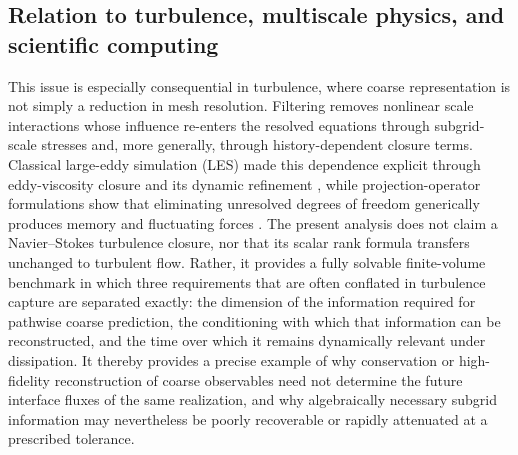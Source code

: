 \documentclass[pdflatex,sn-mathphys-num]{sn-jnl}%
\theoremstyle{thmstyleone}%
\theoremstyle{thmstyletwo}%
\theoremstyle{thmstylethree}%
\begin{document}

\color{black}
\subsection{Relation to turbulence, multiscale physics, and scientific computing}

This issue is especially consequential in turbulence, where coarse representation is not
simply a reduction in mesh resolution. Filtering removes nonlinear scale interactions whose
influence re-enters the resolved equations through subgrid-scale stresses and, more generally,
through history-dependent closure terms. Classical large-eddy simulation (LES) made this
dependence explicit through eddy-viscosity closure and its dynamic refinement
\cite{smagorinsky1963,germano1991}, while projection-operator formulations show that
eliminating unresolved degrees of freedom generically produces memory and fluctuating
forces \cite{zwanzig1961,mori1965}. The present analysis does not claim a
Navier--Stokes turbulence closure, nor that its scalar rank formula transfers unchanged to
turbulent flow. Rather, it provides a fully solvable finite-volume benchmark in which three
requirements that are often conflated in turbulence capture are separated exactly: the
dimension of the information required for pathwise coarse prediction, the conditioning with
which that information can be reconstructed, and the time over which it remains dynamically
relevant under dissipation. It thereby provides a precise example of why conservation or
high-fidelity reconstruction of coarse observables need not determine the future interface
fluxes of the same realization, and why algebraically necessary subgrid information may
nevertheless be poorly recoverable or rapidly attenuated at a prescribed tolerance.
\end{document}
